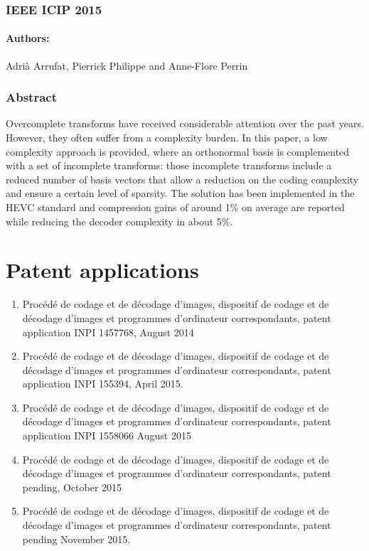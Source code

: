 \documentclass[11pt,a4paper,openright,twoside]{book}
\numberwithin{equation}{section} %
\numberwithin{figure}{section} %
\numberwithin{table}{section} %
\begin{document}
\subsubsection*{IEEE ICIP 2015}
\paragraph{\textsf{Authors:}}
	Adrià Arrufat, Pierrick Philippe and Anne-Flore Perrin
\subsubsection*{Abstract}

Overcomplete transforms have received considerable attention over the past
years.
However, they often suffer from a complexity burden.
In this paper, a low complexity approach is provided, where an orthonormal
basis is complemented with a set of incomplete transforms: those incomplete
transforms include a reduced number of basis vectors that allow a reduction on
the coding complexity and ensure a certain level of sparsity.
The solution has been implemented in the \acs{HEVC}  standard and compression
gains of around 1\% on average are reported while reducing the decoder
complexity in about 5\%.

\section*{Patent applications}
\label{sec:patent_applications}

\begin{enumerate}
	\item Procédé de codage et de décodage d'images, dispositif de codage et
		de décodage d'images et programmes d'ordinateur correspondants,
		patent application INPI 1457768, August 2014
	\item Procédé de codage et de décodage d'images, dispositif de codage et
		de décodage d'images et programmes d'ordinateur correspondants,
		patent application INPI 155394, April 2015.
	\item Procédé de codage et de décodage d'images, dispositif de codage et
		de décodage d'images et programmes d'ordinateur correspondants,
		patent application INPI 1558066 August 2015
	\item Procédé de codage et de décodage d'images, dispositif de codage et
		de décodage d'images et programmes d'ordinateur correspondants,
		patent pending, October 2015
	\item Procédé de codage et de décodage d'images, dispositif de codage et
		de décodage d'images et programmes d'ordinateur correspondants,
		patent pending November 2015.
\end{enumerate}
\end{document}
